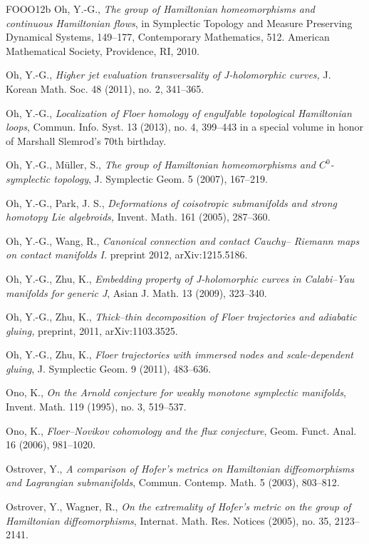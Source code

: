 \begin{thebibliography}{FOOO12b}
 Oh, Y.-G., \emph{The group of Hamiltonian homeomorphisms and continu\-ous
  Hamiltonian flows}, in Symplectic Topology and Measure Preserving Dynamical Systems, 149–177,
  Contemporary Mathematics, 512. Amer\-ican Mathematical Society, Providence, RI, 2010.

 Oh, Y.-G., \emph{Higher jet evaluation transversality of J-holomorphic curves,} J.
  Korean Math. Soc. 48 (2011), no. 2, 341–365.

 Oh, Y.-G., \emph{Localization of Floer homology of engulfable topological
  Hamiltonian loops}, Commun. Info. Syst. 13 (2013), no. 4, 399–443 in a special volume in honor of
  Marshall Slemrod’s 70th birthday.

 Oh, Y.-G., Müller, S., \emph{The group of Hamiltonian homeomorphisms and
  $C^0$-symplectic topology}, J. Symplectic Geom. 5 (2007), 167–219.

 Oh, Y.-G., Park, J. S., \emph{Deformations of coisotropic submanifolds and strong
  homotopy Lie algebroids,} Invent. Math. 161 (2005), 287–360.

 Oh, Y.-G., Wang, R., \emph{Canonical connection and contact Cauchy– Riemann maps
  on contact manifolds I.} preprint 2012, arXiv:1215.5186.

 Oh, Y.-G., Zhu, K., \emph{Embedding property of J-holomorphic curves in Calabi–Yau
  manifolds for generic J}, Asian J. Math. 13 (2009), 323–340.

 Oh, Y.-G., Zhu, K., \emph{Thick–thin decomposition of Floer trajectories and
  adiabatic gluing,} preprint, 2011, arXiv:1103.3525.

 Oh, Y.-G., Zhu, K., \emph{Floer trajectories with immersed nodes and
  scale-dependent gluing}, J. Symplectic Geom. 9 (2011), 483–636.

 Ono, K., \emph{On the Arnold conjecture for weakly monotone symplectic manifolds},
  Invent. Math. 119 (1995), no. 3, 519–537.

 Ono, K., \emph{Floer–Novikov cohomology and the flux conjecture}, Geom. Funct. Anal.
  16 (2006), 981–1020.

 Ostrover, Y., \emph{A comparison of Hofer’s metrics on Hamiltonian diﬀeo\-morphisms
  and Lagrangian submanifolds}, Commun. Contemp. Math. 5 (2003), 803–812.

 Ostrover, Y., Wagner, R., \emph{On the extremality of Hofer’s metric on the group of
  Hamiltonian diﬀeomorphisms}, Internat. Math. Res. Notices (2005), no. 35, 2123–2141.


\end{thebibliography}

